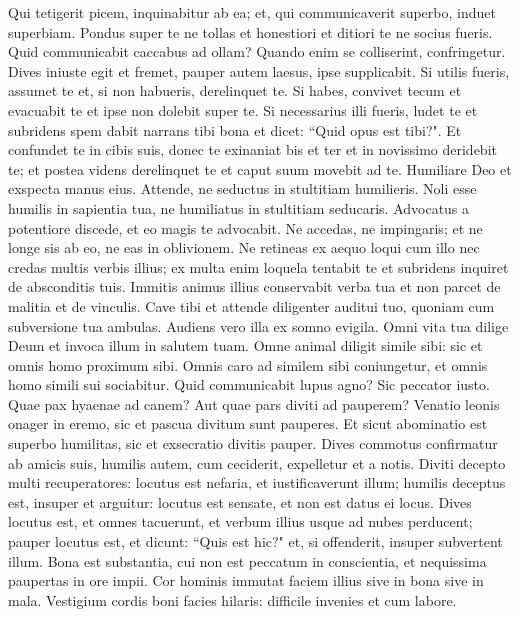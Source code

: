 \begin{biblechapter}  
\verse Qui tetigerit picem, inquinabitur ab ea; et, qui communicaverit superbo, induet superbiam. 
\verse Pondus super te ne tollas et honestiori et ditiori te ne socius fueris. 
\verse Quid communicabit caccabus ad ollam? Quando enim se colliserint, confringetur. 
\verse Dives iniuste egit et fremet, pauper autem laesus, ipse supplicabit. 
\verse Si utilis fueris, assumet te et, si non habueris, derelinquet te. 
\verse Si habes, convivet tecum et evacuabit te et ipse non dolebit super te. 
\verse Si necessarius illi fueris, ludet te et subridens spem dabit narrans tibi bona et dicet: “Quid opus est tibi?". 
\verse Et confundet te in cibis suis, donec te exinaniat bis et ter et in novissimo deridebit te; et postea videns derelinquet te et caput suum movebit ad te. 
\verse Humiliare Deo et exspecta manus eius. 
\verse Attende, ne seductus in stultitiam humilieris. 
\verse Noli esse humilis in sapientia tua, ne humiliatus in stultitiam seducaris. 
\verse Advocatus a potentiore discede, et eo magis te advocabit. 
\verse Ne accedas, ne impingaris; et ne longe sis ab eo, ne eas in oblivionem. 
\verse Ne retineas ex aequo loqui cum illo nec credas multis verbis illius; ex multa enim loquela tentabit te et subridens inquiret de absconditis tuis. 
\verse Immitis animus illius conservabit verba tua et non parcet de malitia et de vinculis. 
\verse Cave tibi et attende diligenter auditui tuo, quoniam cum subversione tua ambulas. 
\verse Audiens vero illa ex somno evigila. 
\verse Omni vita tua dilige Deum et invoca illum in salutem tuam. 
\verse Omne animal diligit simile sibi: sic et omnis homo proximum sibi. 
\verse Omnis caro ad similem sibi coniungetur, et omnis homo simili sui sociabitur. 
\verse Quid communicabit lupus agno? Sic peccator iusto. 
\verse Quae pax hyaenae ad canem? Aut quae pars diviti ad pauperem? 
\verse Venatio leonis onager in eremo, sic et pascua divitum sunt pauperes. 
\verse Et sicut abominatio est superbo humilitas, sic et exsecratio divitis pauper. 
\verse Dives commotus confirmatur ab amicis suis, humilis autem, cum ceciderit, expelletur et a notis. 
\verse Diviti decepto multi recuperatores: locutus est nefaria, et iustificaverunt illum; 
\verse humilis deceptus est, insuper et arguitur: locutus est sensate, et non est datus ei locus. 
\verse Dives locutus est, et omnes tacuerunt, et verbum illius usque ad nubes perducent; 
\verse pauper locutus est, et dicunt: “Quis est hic?" et, si offenderit, insuper subvertent illum. 
\verse Bona est substantia, cui non est peccatum in conscientia, et nequissima paupertas in ore impii. 
\verse Cor hominis immutat faciem illius sive in bona sive in mala. 
\verse Vestigium cordis boni facies hilaris: difficile invenies et cum labore. 
\end{biblechapter}

